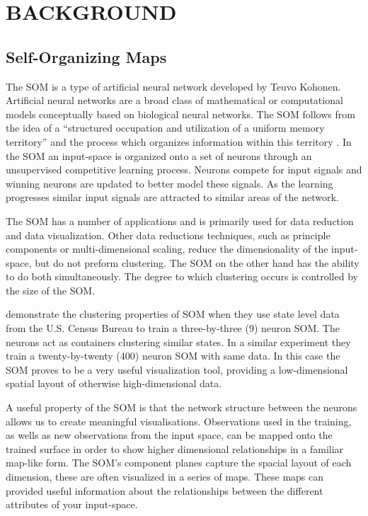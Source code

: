 \chapter{BACKGROUND}


\section{Self-Organizing Maps}
\label{bg:som}
The SOM is a type of artificial neural network developed by Teuvo Kohonen. 
Artificial neural networks are a broad class of mathematical or computational
models conceptually based on biological neural networks.  The SOM follows from
the idea of a ``structured occupation and utilization of a uniform memory
territory'' and the process which organizes information within this territory
\cite[p. 102]{Kohonen2000}.  In the SOM an input-space is organized onto a set
of neurons through an unsupervised competitive learning process.  Neurons
compete for input signals and winning neurons are updated to better model
these signals. As the learning progresses similar input signals are attracted
to similar areas of the network.

The SOM has a number of applications and is primarily used for data reduction
and data visualization.  Other data reductions techniques, such as principle
components or multi-dimensional scaling, reduce the dimensionality of 
the input-space, but do not preform clustering.  The SOM on the other hand has
the ability to do both simultaneously.  The degree to which clustering occurs
is controlled by the size of the SOM.

\cite{skupin08} demonstrate the clustering properties of SOM when they use
state level data from the U.S. Census Bureau to train a three-by-three (9)
neuron SOM.  The neurons act as containers clustering similar states.  In a
similar experiment they train a twenty-by-twenty (400) neuron SOM with same
data.  In this case the SOM proves to be a very useful visualization tool,
providing a low-dimensional spatial layout of otherwise high-dimensional data.

A useful property of the SOM is that the network structure between the neurons
allows us to create meaningful visualisations.  Observations used in the
training, as wells as new observations from the input space,  can be mapped
onto the trained surface in order to show higher dimensional relationships in a
familiar map-like form. The SOM's component planes capture the spacial layout
of each dimension, these are often visualized in a series of maps.  These
maps can provided useful information about the relationships between the
different attributes of your input-space.

